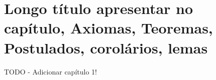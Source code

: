 
\chapter[Abreviação para o Sumário]{Longo título apresentar no capítulo, Axiomas, Teoremas, Postulados, corolários, lemas}

\label{cap_exemplos}

TODO - Adicionar capítulo 1!

